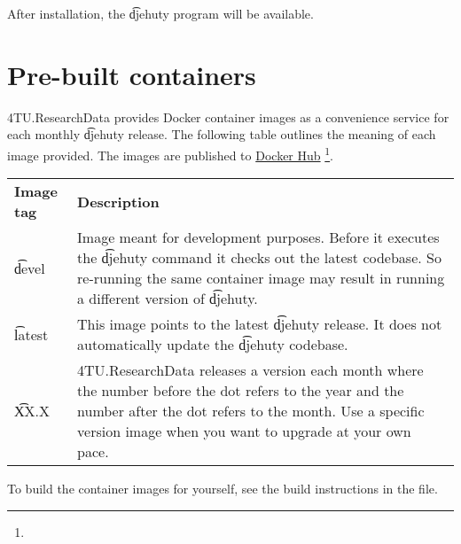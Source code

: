   After installation, the \t{djehuty} program will be available.

\section{Pre-built containers}

  4TU.ResearchData provides Docker container images as a convenience service
  for each monthly \t{djehuty} release.  The following table outlines the
  meaning of each image provided.  The images are published to
  \href{https://hub.docker.com/r/4turesearchdata/djehuty}{Docker Hub}%
  \footnote{}.

\begin{tabular}{p{} p{}}
  \textbf{Image tag}  & \textbf{Description}\\
  \t{devel}           & Image meant for development purposes.  Before it
                        executes the \t{djehuty} command it checks out the
                        latest codebase.  So re-running the same container
                        image may result in running a different version of
                        \t{djehuty}.\\
  \t{latest}          & This image points to the latest \t{djehuty} release.
                        It does not automatically update the \t{djehuty}
                        codebase.\\
  \t{XX.X}            & 4TU.ResearchData releases a version each month where
                        the number before the dot refers to the year and the
                        number after the dot refers to the month.  Use a
                        specific version image when you want to upgrade at
                        your own pace.\\
\end{tabular}

  To build the container images for yourself, see the build instructions in
  the  file.
